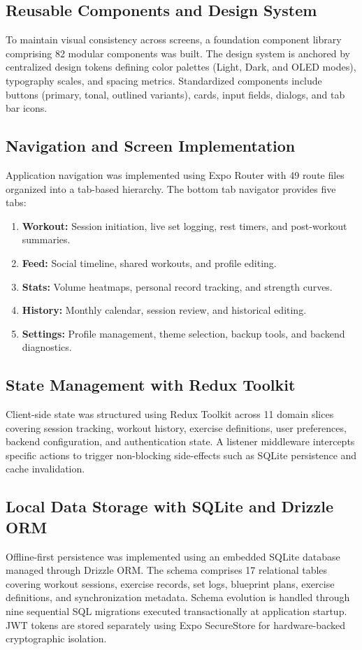 \subsection{Reusable Components and Design System}
To maintain visual consistency across screens, a foundation component library comprising 82 modular components was built. The design system is anchored by centralized design tokens defining color palettes (Light, Dark, and OLED modes), typography scales, and spacing metrics. Standardized components include buttons (primary, tonal, outlined variants), cards, input fields, dialogs, and tab bar icons.

\subsection{Navigation and Screen Implementation}
Application navigation was implemented using Expo Router with 49 route files organized into a tab-based hierarchy. The bottom tab navigator provides five tabs:
\begin{enumerate}
    \item \textbf{Workout:} Session initiation, live set logging, rest timers, and post-workout summaries.
    \item \textbf{Feed:} Social timeline, shared workouts, and profile editing.
    \item \textbf{Stats:} Volume heatmaps, personal record tracking, and strength curves.
    \item \textbf{History:} Monthly calendar, session review, and historical editing.
    \item \textbf{Settings:} Profile management, theme selection, backup tools, and backend diagnostics.
\end{enumerate}

\subsection{State Management with Redux Toolkit}
Client-side state was structured using Redux Toolkit across 11 domain slices covering session tracking, workout history, exercise definitions, user preferences, backend configuration, and authentication state. A listener middleware intercepts specific actions to trigger non-blocking side-effects such as SQLite persistence and cache invalidation.

\subsection{Local Data Storage with SQLite and Drizzle ORM}
Offline-first persistence was implemented using an embedded SQLite database managed through Drizzle ORM. The schema comprises 17 relational tables covering workout sessions, exercise records, set logs, blueprint plans, exercise definitions, and synchronization metadata. Schema evolution is handled through nine sequential SQL migrations executed transactionally at application startup. JWT tokens are stored separately using Expo SecureStore for hardware-backed cryptographic isolation.

